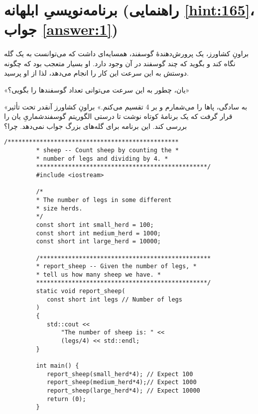 \section[برنامه‌نویسیِ ابلهانه]{برنامه‌نویسیِ ابلهانه \protect{} (راهنمایی \ref{hint:165}، جواب \ref{answer:1})}
\paragraph{}\label{prog:55}
براونِ کشاورز، یک پرورش‌دهندهٔ گوسفند، همسایه‌ای داشت که می‌توانست به یک گله نگاه کند و بگوید که چند گوسفند در آن وجود دارد. او بسیار متعجب بود که چگونه دوستش به این سرعت این کار را انجام می‌دهد، لذا از او پرسید.

«یان، چطور به این سرعت می‌توانی تعداد گوسفندها را بگویی؟»

«به سادگی، پاها را می‌شمارم و بر 4 تقسیم می‌کنم.»
براونِ کشاورز آنقدر تحت تأثیر قرار گرفت که یک برنامهٔ  کوتاه نوشت تا درستی الگوریتم گوسفندشماریِ یان را بررسی کند. این برنامه برای گله‌های بزرگ جواب نمی‌دهد. چرا؟

\begin{LTR}
    \begin{lstlisting}[style=C++Style]
         /************************************************
         * sheep -- Count sheep by counting the *
         * number of legs and dividing by 4. *
         ************************************************/
         #include <iostream>

         /*
         * The number of legs in some different
         * size herds.
         */
         const short int small_herd = 100;
         const short int medium_herd = 1000;
         const short int large_herd = 10000;

         /************************************************
         * report_sheep -- Given the number of legs, *
         * tell us how many sheep we have. *
         ************************************************/
         static void report_sheep(
         	const short int legs // Number of legs
         )
         {
         	std::cout <<
         		"The number of sheep is: " <<
         		(legs/4) << std::endl;
         }

         int main() {
         	report_sheep(small_herd*4); // Expect 100
         	report_sheep(medium_herd*4);// Expect 1000
         	report_sheep(large_herd*4); // Expect 10000
         	return (0);
         }
    \end{lstlisting}
\end{LTR}